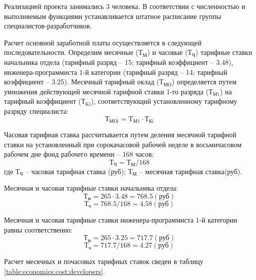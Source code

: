 Реализацией проекта занимались 3 человека. В соответствии с численностью и выполняемым функциями устанавливается штатное расписание группы специалистов-разработчиков.

Расчет основной заработной платы осуществляется в следующей последовательности. Определим месячные (${\text{Т}}_{\text{М}}$) и часовые (${\text{Т}}_{\text{Ч}}$) тарифные ставки начальника отдела (тарифный разряд -- 15; тарифный коэффициент – 3.48), инженера-программиста 1-й категории (тарифный разряд -- 14; тарифный коэффициент -- 3.25). Месячный тарифный оклад (${\text{Т}}_{\text{МО}}$) определяется путем умножения действующей месячной тарифной ставки 1-го разряда (${\text{Т}}_{\text{М1}}$) на тарифный коэффициент (${\text{Т}}_{\text{Ki}}$), соответствующий установленному тарифному разряду специалиста:
\begin{equation}
\label{formula:economics:cost:f_tmoi}
{\text{Т}}_{\text{МОi}} = {\text{T}}_{\text{М1}} \cdot {\text{Т}}_{\text{Кi}}
\end{equation}

Часовая тарифная ставка рассчитывается путем деления месячной тарифной ставки на установленный при сорокачасовой рабочей неделе в восьмичасовом рабочем дне фонд рабочего времени – 168 часов:
\begin{equation}
\label{formula:economics:cost:f_chts}
{\text{Т}}_{\text{Ч}} = {\text{Т}}_{\text{М}} / 168
\end{equation}
где ${\text{Т}}_{\text{Ч}}$ -- часовая тарифная ставка (руб); ${\text{Т}}_{\text{М}}$ -- месячная тарифная ставка(руб).

Месячная и часовая тарифные ставки начальника отдела:
$${\text{Т}}_{\text{м}} = 265 \cdot 3.48 = 768.5 (\text{руб})$$
$${\text{Т}}_{\text{ч}} = 768.5 / 168 = 4.58 (\text{руб})$$

Месячная и часовая тарифные ставки инженера-программиста 1-й категории равны соответственно:
$${\text{Т}}_{\text{м}} = 265 \cdot 3.25 = 717.7 (\text{руб})$$
$${\text{Т}}_{\text{ч}} = 717.7 / 168 = 4.27 (\text{руб})$$

Расчет месячных и почасовых тарифных ставок сведен в таблицу \ref{table:economics:cost:developers}.

